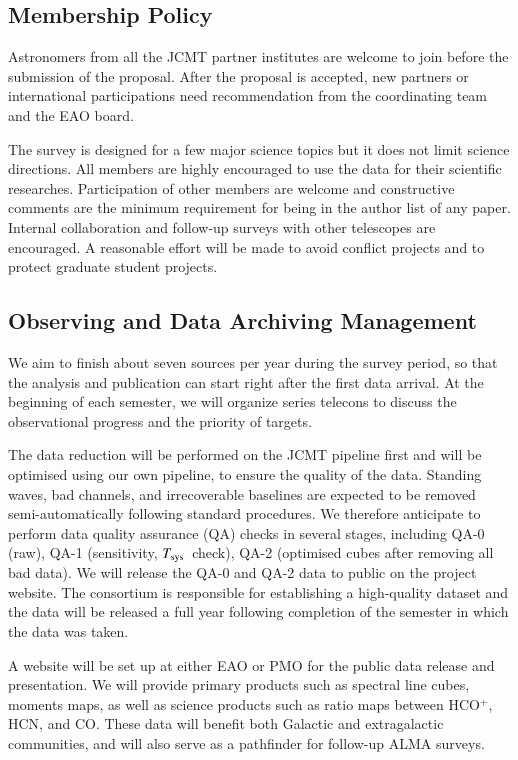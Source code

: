\documentclass[legal,11pt]{article}
\def\Tsys {$T_{\rm sys}$}
\def\HCOP       {HCO$^{+}$}
\begin{document}
\subsection{Membership Policy}

Astronomers from all the JCMT partner institutes are welcome to join before the
submission of the proposal. After the proposal is accepted, new partners or
international participations need  recommendation from the coordinating team
and the EAO board. 

The survey is designed for a few major science topics but it does not limit
science directions. All members are highly encouraged to use the data for their
scientific researches. Participation of other members are welcome and
constructive comments are the minimum requirement for being in the author list
of any paper. Internal collaboration and follow-up surveys with other
telescopes are encouraged. A reasonable effort will be made to avoid conflict
projects and to protect graduate student projects.


\subsection{Observing and  Data Archiving Management}

We aim to finish about seven sources per year during the survey period, so that
the analysis and publication can start right after the first data arrival. At
the beginning of each semester, we will organize series telecons to discuss the
observational progress and the priority of targets. 

The data reduction will be performed on the JCMT pipeline first and will be
optimised using our own pipeline, to ensure the quality of the data. Standing
waves, bad channels, and irrecoverable baselines are expected to be removed
semi-automatically following standard procedures. We therefore anticipate to
perform data quality assurance (QA) checks in several stages, including QA-0
(raw), QA-1 (sensitivity, \Tsys\ check), QA-2 (optimised cubes after removing
all bad data). We will release the QA-0 and QA-2 data to public on the project
website. The consortium is responsible for establishing a high-quality dataset
and the data will be released a full year following completion of the semester
in which the data was taken.

A website will be set up at either EAO or PMO for the public data release and
presentation. We will provide primary products such as spectral line cubes,
moments maps, as well as science products such as ratio maps between \HCOP,
HCN, and CO. These data will benefit both Galactic and extragalactic
communities, and will also serve as a pathfinder for follow-up ALMA surveys.
\end{document}
